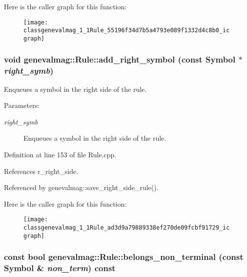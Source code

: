 Here is the caller graph for this function:\nopagebreak
\begin{figure}[H]
\begin{center}
\leavevmode
\texttt{[image: classgenevalmag\_1\_1Rule\_55196f34d7b5a4793e089f1332d4c8b0\_icgraph]}
\end{center}
\end{figure}
\hypertarget{classgenevalmag_1_1Rule_ad3d9a79889338ef270de09fcbf91729}{
\subsubsection[{add\_\-right\_\-symbol}]{\setlength{\rightskip}{0pt plus 5cm}void genevalmag::Rule::add\_\-right\_\-symbol (const {\bf Symbol} $\ast$ {\em right\_\-symb})}}
\label{classgenevalmag_1_1Rule_ad3d9a79889338ef270de09fcbf91729}


Enqueues a symbol in the right side of the rule. \begin{Desc}
\item[Parameters:]
\begin{description}
\item[{\em right\_\-symb}]Enqueues a symbol in the right side of the rule. \end{description}
\end{Desc}


Definition at line 153 of file Rule.cpp.

References r\_\-right\_\-side.

Referenced by genevalmag::save\_\-right\_\-side\_\-rule().

Here is the caller graph for this function:\nopagebreak
\begin{figure}[H]
\begin{center}
\leavevmode
\texttt{[image: classgenevalmag\_1\_1Rule\_ad3d9a79889338ef270de09fcbf91729\_icgraph]}
\end{center}
\end{figure}
\hypertarget{classgenevalmag_1_1Rule_587e49507f553c99c79c82aabe6c470f}{
\subsubsection[{belongs\_\-non\_\-terminal}]{\setlength{\rightskip}{0pt plus 5cm}const bool genevalmag::Rule::belongs\_\-non\_\-terminal (const {\bf Symbol} \& {\em non\_\-term}) const}}
\label{classgenevalmag_1_1Rule_587e49507f553c99c79c82aabe6c470f}


